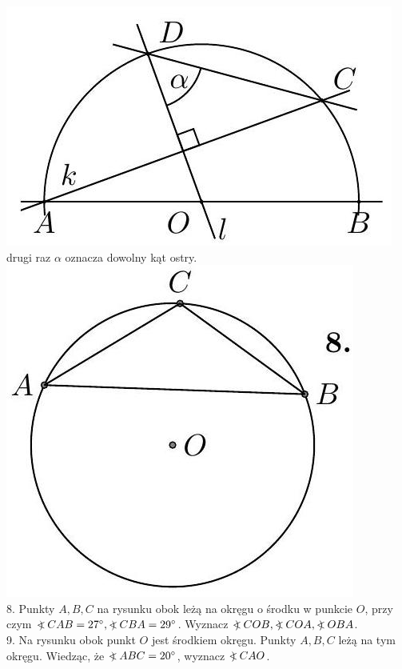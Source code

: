 \documentclass[10pt]{article}
\newcommand\Varangle{\mathop{{<\!\!\!\!\!\text{\small)}}\:}\nolimits}
\begin{document}
\includegraphics[max width=\textwidth, center]{2024_11_21_71f62bd117d375398909g-183(2)}\\
drugi raz \(\alpha\) oznacza dowolny kąt ostry.\\
\includegraphics[max width=\textwidth, center]{2024_11_21_71f62bd117d375398909g-183(3)}\\
8. Punkty \(A, B, C\) na rysunku obok leżą na okręgu o środku w punkcie \(O\), przy czym \(\Varangle C A B=27^{\circ}, \Varangle C B A=29^{\circ}\). Wyznacz \(\Varangle C O B, \Varangle C O A, \Varangle O B A\).\\
9. Na rysunku obok punkt \(O\) jest środkiem okręgu. Punkty \(A, B, C\) leżą na tym okręgu. Wiedząc, że \(\Varangle A B C=20^{\circ}\), wyznacz \(\Varangle C A O\).\\
\end{document}
